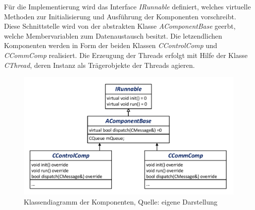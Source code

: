 Für die Implementierung wird das Interface \textit{IRunnable} definiert, welches virtuelle Methoden zur Initialisierung und Ausführung der Komponenten vorschreibt. Diese Schnittstelle wird von der abstrakten Klasse \textit{AComponentBase} geerbt, welche Membervariablen zum Datenaustausch besitzt. Die letzendlichen Komponenten werden in Form der beiden Klassen \textit{CControlComp} und \textit{CCommComp} realisiert. Die Erzeugung der Threads erfolgt mit Hilfe der Klasse \textit{CThread}, deren Instanz als Trägerobjekte der Threads agieren.
\begin{figure}[!h]
\centering
\includegraphics[width=0.6\linewidth]{img/SW_1_KA_KD.pdf}
\caption{Klassendiagramm der Komponenten, Quelle: eigene Darstellung}
\end{figure}

